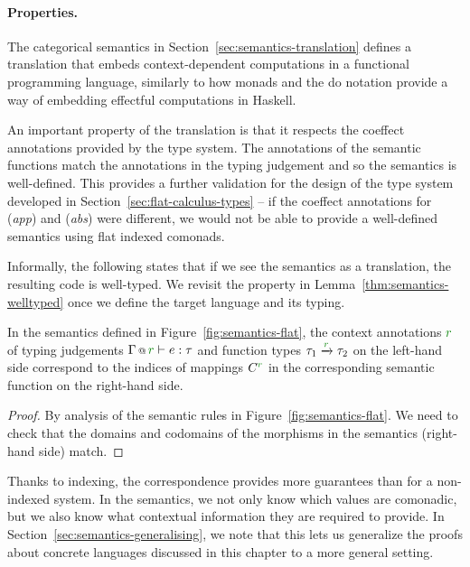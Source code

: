 \paragraph{Properties.}
The categorical semantics  in Section~\ref{sec:semantics-translation} defines a translation
that embeds context-dependent computations in a functional programming language, similarly to how
monads and the do notation provide a way of embedding effectful computations in Haskell.

An important property of the translation is that it respects the coeffect annotations provided
by the type system. The annotations of the semantic functions match the annotations in the typing
judgement and so the semantics is well-defined.
This provides a further validation for the design of the type system developed in
Section~\ref{sec:flat-calculus-types} -- if the coeffect annotations for (\emph{app}) and (\emph{abs})
were different, we would not be able to provide a well-defined semantics using flat indexed comonads.

Informally, the following states that if we see the semantics as a translation, the resulting code
is well-typed. We revisit the property in Lemma~\ref{thm:semantics-welltyped} once we define
the target language and its typing.

\begin{lemma}[Correspondence]
\label{thm:flat-correspondence}
In the semantics defined in Figure~\ref{fig:semantics-flat}, the context annotations $\cclrd{r}$ of
typing judgements $\coctx{\Gamma}{\cclrd{r}} \vdash e : \tau$ and function types
$\tau_1 \xrightarrow{\cclrd{r}} \tau_2$  on the left-hand side correspond to the indices of mappings
$\ctyp{\cclrd{r}}{}$ in the corresponding semantic function on the right-hand side.
\end{lemma}
\begin{proof}
By analysis of the semantic rules in Figure~\ref{fig:semantics-flat}. We need to check that the
domains and codomains of the morphisms in the semantics (right-hand side) match.
\end{proof}

\noindent
Thanks to indexing, the correspondence provides more guarantees than for a non-indexed system.
In the semantics, we not only know which values are comonadic, but we also know what contextual
information they are required to provide. In Section~\ref{sec:semantics-generalising}, we note
that this lets us generalize the proofs about concrete languages discussed in this chapter to
a more general setting.

